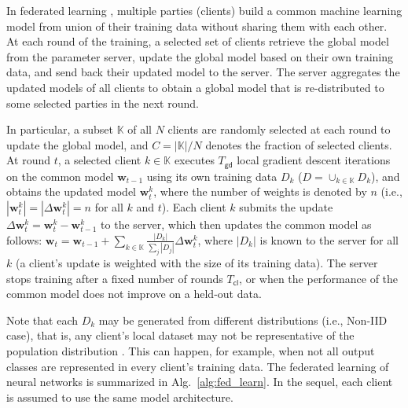\documentclass[accepted]{uai2021} %
\newcommand{\todo}[1]{{\color{red}{\textbf{TODO:}  #1}}}
\newcommand{\mbf}[1]{{\mathbf{#1}}}
\newcommand{\Tcl}{T_{\mathsf{cl}}}
\newcommand{\Tgd}{T_{\mathsf{gd}}}
\begin{document}
In federated learning \citep{ShokriS15,FedAVG}, multiple parties (clients) build a common machine learning model from union of their training data without sharing them with each other. At each round of the training, a selected set of clients retrieve the global model from the parameter server, update the global model based on their own training data, and send back their updated model to the server. The server aggregates the updated models of all clients to obtain a global model that is re-distributed to some selected parties in the next round.  

In particular, a subset $\mathbb{K}$ of all $N$ clients are randomly selected at each round to update the global model, and $C = |\mathbb{K}| / N$ denotes the fraction of selected clients. At round $t$, a selected client $k \in \mathbb{K}$ executes $\Tgd$ local gradient descent iterations on the common model $\mbf{w}_{t-1}$ using its own training data $D_k$ ($D = \cup_{k\in \mathbb{K}} D_k$), and obtains the updated model $\mbf{w}_{t}^k$, where the number of weights is denoted by $n$ (i.e., $|\mbf{w}_t^{k}| = |\Delta \mbf{w}_t^k| = n$ for all $k$ and $t$). Each client $k$ submits the update $\Delta \mbf{w}_{t}^k = \mbf{w}_{t}^k - \mbf{w}_{t-1}^k$ to the server, which then updates the common model as follows: $\mbf{w}_{t} = \mbf{w}_{t-1} + \sum_{k \in \mathbb{K}} \frac{|D_k|}{\sum_j |D_j|} \Delta \mbf{w}_{t}^k$, where $|D_k|$ is known to the server for all $k$ (a client's update is weighted with the size of its training data).
The server stops training after a fixed number of rounds $\Tcl$, or when the performance of the common model does not improve on a held-out data. 

Note that each $D_k$ may be generated from different distributions (i.e., Non-IID case), that is, any client's local dataset may not be representative of the population distribution \citep{FedAVG}. This can happen, for example, when not all output classes are represented in every client's training data. 
The federated learning of neural networks is summarized in Alg.~\ref{alg:fed_learn}. In the sequel, each client is assumed to use the same model architecture.




\end{document}
